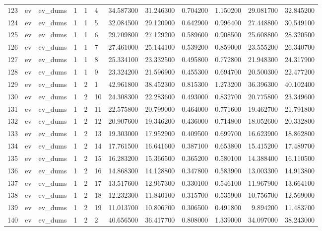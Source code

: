 \begin{tabular}{llllllrrrrrr}
123 & ev & ev_dums & 1 & 1 & 4 & 34.587300 & 31.246300 & 0.704200 & 1.150200 & 29.081700 & 32.845200 \\
124 & ev & ev_dums & 1 & 1 & 5 & 32.084500 & 29.120900 & 0.642900 & 0.996400 & 27.448800 & 30.549100 \\
125 & ev & ev_dums & 1 & 1 & 6 & 29.709800 & 27.129200 & 0.589600 & 0.908500 & 25.608800 & 28.320500 \\
126 & ev & ev_dums & 1 & 1 & 7 & 27.461000 & 25.144100 & 0.539200 & 0.859000 & 23.555200 & 26.340700 \\
127 & ev & ev_dums & 1 & 1 & 8 & 25.334100 & 23.332500 & 0.495800 & 0.772800 & 21.948300 & 24.317900 \\
128 & ev & ev_dums & 1 & 1 & 9 & 23.324200 & 21.596900 & 0.455300 & 0.694700 & 20.500300 & 22.477200 \\
129 & ev & ev_dums & 1 & 2 & 1 & 42.961800 & 38.452300 & 0.815300 & 1.273200 & 36.396300 & 40.102400 \\
130 & ev & ev_dums & 1 & 2 & 10 & 24.308300 & 22.283600 & 0.493000 & 0.832700 & 20.775800 & 23.349600 \\
131 & ev & ev_dums & 1 & 2 & 11 & 22.575800 & 20.799000 & 0.464000 & 0.771600 & 19.462700 & 21.791800 \\
132 & ev & ev_dums & 1 & 2 & 12 & 20.907600 & 19.346200 & 0.436000 & 0.714800 & 18.052600 & 20.332800 \\
133 & ev & ev_dums & 1 & 2 & 13 & 19.303000 & 17.952900 & 0.409500 & 0.699700 & 16.623900 & 18.862800 \\
134 & ev & ev_dums & 1 & 2 & 14 & 17.761500 & 16.641600 & 0.387100 & 0.653800 & 15.415200 & 17.489700 \\
135 & ev & ev_dums & 1 & 2 & 15 & 16.283200 & 15.366500 & 0.365200 & 0.580100 & 14.388400 & 16.110500 \\
136 & ev & ev_dums & 1 & 2 & 16 & 14.868300 & 14.128800 & 0.347800 & 0.583900 & 13.003300 & 14.913800 \\
137 & ev & ev_dums & 1 & 2 & 17 & 13.517600 & 12.967300 & 0.330100 & 0.546100 & 11.967900 & 13.664100 \\
138 & ev & ev_dums & 1 & 2 & 18 & 12.232300 & 11.840100 & 0.315700 & 0.535900 & 10.756700 & 12.569000 \\
139 & ev & ev_dums & 1 & 2 & 19 & 11.013700 & 10.806700 & 0.306500 & 0.491800 & 9.894200 & 11.483700 \\
140 & ev & ev_dums & 1 & 2 & 2 & 40.656500 & 36.417700 & 0.808000 & 1.339000 & 34.097000 & 38.243000 \\

\end{tabular}
